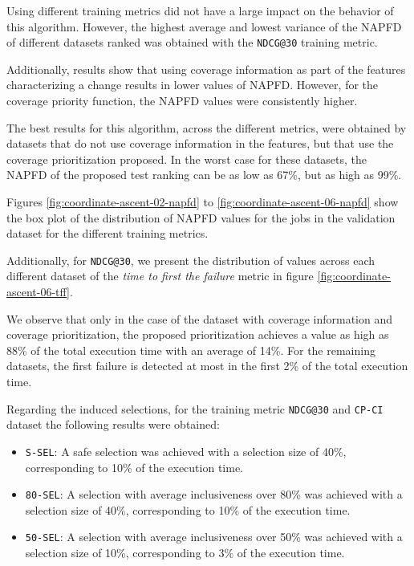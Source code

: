 Using different training metrics did not have a large impact on the behavior of this algorithm. 
However, the highest average and lowest variance of the NAPFD of different datasets ranked was obtained with the 
\texttt{NDCG@30} training metric.

Additionally, results show that using coverage information as part of the features characterizing a change
results in lower values of NAPFD. However, for the coverage priority function, the NAPFD values were 
consistently higher.

The best results for this algorithm, across the different metrics, were obtained by datasets that do not
use coverage information in the features, but that use the coverage prioritization proposed. In the worst case
for these datasets, the NAPFD of the proposed test ranking can be as low as 67\%, but as high as 99\%.

Figures \ref{fig:coordinate-ascent-02-napfd} to \ref{fig:coordinate-ascent-06-napfd} show the box plot of the distribution
of NAPFD values for the jobs in the validation dataset for the different training metrics. 

Additionally, for \texttt{NDCG@30}, we present the distribution of values 
across each different dataset of the \emph{time to first the failure} metric in figure \ref{fig:coordinate-ascent-06-tff}. 

We observe that only in the case of the dataset with coverage information and coverage prioritization, the proposed prioritization
achieves a value as high as 88\% of the total execution time with an average of 14\%. For the remaining datasets, the first failure is detected
at most in the first 2\% of the total execution time.

Regarding the induced selections, for the training metric \texttt{NDCG@30} and \texttt{CP-CI} dataset the following results were obtained:
\begin{itemize}
    \item \texttt{S-SEL}: A safe selection was achieved with a selection size of 40\%, corresponding to 10\% of the execution time.
    \item \texttt{80-SEL}: A selection with average inclusiveness over 80\% was achieved with a selection size of 40\%, corresponding to 10\% of the execution time.
    \item \texttt{50-SEL}: A selection with average inclusiveness over 50\% was achieved with a selection size of 10\%, corresponding to 3\% of the execution time.
\end{itemize}

